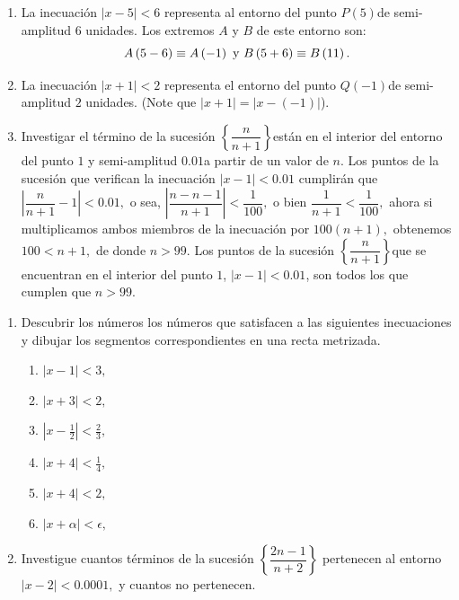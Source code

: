 \documentclass[oneside,english,spanish,2m,twoside,svgnames,x11names,HTML,twoside,12pt]{libro-matua}\usepackage[]{graphicx}\usepackage[]{color}
\newcommand{\val}[1]{\left|#1\right|}
\begin{document}
\begin{ejemplos}
\begin{enumerate}
\item La inecuación $\val{x-5}<6$ representa al entorno del punto $P\left(5\right)$de
semi-amplitud $6$ unidades. Los extremos $A$ y $B$ de este entorno
son: 
\[
A\left(5-6\right)\equiv A\left(-1\right)\text{ y \ensuremath{B\left(5+6\right)\equiv B\left(11\right).}}
\]
\item La inecuación $\val{x+1}<2$ representa el entorno del punto $Q\left(-1\right)$de
semi-amplitud $2$ unidades. (Note que $\val{x+1}=\val{x-\left(-1\right)}$).
\item Investigar el término de la sucesión $\left\{ \dfrac{n}{n+1}\right\} $están
en el interior del entorno del punto $1$ y semi-amplitud $0.01$a
partir de un valor de $n.$ \linebreak{}
\sol Los puntos de la sucesión que verifican la inecuación $\val{x-1}<0.01$
cumplirán que $\val{\dfrac{n}{n+1}-1}<0.01,$ o sea, $\val{\dfrac{n-n-1}{n+1}}<\dfrac{1}{100},$
o bien $\dfrac{1}{n+1}<\dfrac{1}{100},$ ahora si multiplicamos ambos
miembros de la inecuación por $100\left(n+1\right),$ obtenemos $100<n+1,$
de donde $n>99.$ \linebreak{}
\resp Los puntos de la sucesión $\left\{ \dfrac{n}{n+1}\right\} $que
se encuentran en el interior del punto $1$, $\val{x-1}<0.01$, son
todos los que cumplen que $n>99.$\fin
\end{enumerate}
\end{ejemplos}

\begin{ejercicios}[]
\begin{enumerate}
\item Descubrir los números los números que satisfacen a las siguientes
inecuaciones y dibujar los segmentos correspondientes en una recta
metrizada.
\begin{enumerate}
\item $\val{x-1}<3,$
\item $\val{x+3}<2,$
\item $\val{x-\frac{1}{2}}<\frac{2}{3},$
\item $\val{x+4}<\frac{1}{4},$
\item $\val{x+4}<2,$
\item $\val{x+\alpha}<\epsilon,$
\end{enumerate}
\item Investigue cuantos términos de la sucesión $\left\{ \dfrac{2n-1}{n+2}\right\} $
pertenecen al entorno $\val{x-2}<0.0001,$ y cuantos no pertenecen.
\end{enumerate}
\end{ejercicios}
\end{document}

